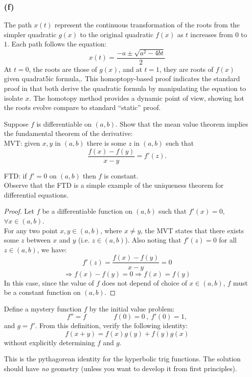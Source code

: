 \documentclass{article}
\begin{document}
\subsubsection*{(f)}
The path $x(t)$ represent the continuous transformation of the roots from the simpler quadratic $g(x)$ to the original quadratic $f(x)$ as $t$ increases from $0$ to $1$.
Each path follows the equation:
\[ x(t) = \frac{-a \pm \sqrt{a^2 - 4bt}}{2} \]
At $t = 0$, the roots are those of $g(x)$, and at $t=1$, they are roots of $f(x)$ given quadrat5ic formula,. This homoptopy-based proof indicates the standard proof in that both derive the quadratic formula by manipulating the equation to isolate $x$.
The homotopy method provides a dynamic point of view, showing hot the roots evolve compare to standard ``static'' proof.


\begin{problem}
    Suppose \(f\) is differentiable on \((a,b)\). Show that the mean value theorem implies the fundamental theorem of the derivative:\\
    
    MVT: given \(x,y\) in \((a,b)\) there is some \(z\) in \((a,b)\) such that
    \[\frac{f(x) - f(y)}{x-y} = f'(z).\]

    FTD: if \(f' = 0\) on \((a,b)\) then \(f\) is constant.\\

    Observe that the FTD is a simple example of the uniqueness theorem for differential equations.
\end{problem}


\begin{proof}
    Let $f$ be a differentiable function on $(a,b)$ such that $f'(x) = 0$, $\forall x \in (a,b)$.
    \\
    For any two point $x,y \in (a,b)$, where $x \neq y$, the MVT states that there exists some $z$ between $x$ and $y$ (i.e. $z \in (a,b)$). Also noting that $f'(z) = 0$ for all $z \in (a, b)$, we have:
    \[ f'(z) = \frac{f(x) - f(y)}{x - y} = 0 \]
    \[ \Rightarrow f(x) - f(y) = 0 \Rightarrow f(x) = f(y) \]
    In this case, since the value of $f$ does not depend of choice of $x \in (a, b)$, $f$ must be a constant function on $(a,b)$.
\end{proof}


\begin{problem}
    Define a mystery function \(f\) by the initial value problem:
    \[f'' = f\hspace{4em}f(0) = 0\ ,\ f'(0) = 1,\]
    and \(g=f'\). From this definition, verify the following identity:
    \[f(x+y) = f(x)g(y) + f(y)g(x)\]
    without explicitly determining \(f\) and \(g\).
    
    \hspace{2em}This is the pythagorean identity for the hyperbolic trig functions. The solution should have \emph{no} geometry (unless you want to develop it from first principles).
\end{problem}
\end{document}
